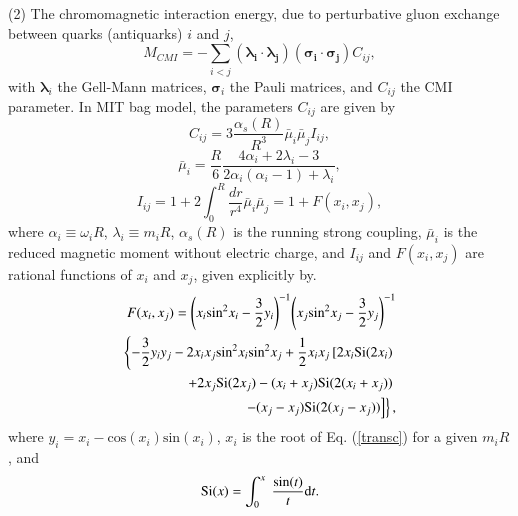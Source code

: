 \documentclass[12pt,prd,onecolumn,floatfix,nofootinbib]{revtex4}
\begin{document}
(2) The chromomagnetic interaction energy, due to perturbative gluon
exchange between quarks (antiquarks) $i$ and $j$,
\begin{equation}
M_{CMI}=-\sum_{i<j}\left( \boldsymbol{\lambda _{i}}\cdot \boldsymbol{\lambda
_{j}}\right) \left( \boldsymbol{\sigma _{i}}\cdot \boldsymbol{\sigma _{j}}%
\right) C_{ij},  \label{CMI}
\end{equation}%
with $\boldsymbol{\lambda }_{i}$ the Gell-Mann matrices, $\boldsymbol{\sigma
}_{i}$ the Pauli matrices, and $C_{ij}$ the CMI parameter. In MIT bag model,
the parameters $C_{ij}$ are given by
\begin{equation}
C_{ij}=3\frac{\alpha _{s}\left( R\right) }{R^{3}}\bar{\mu}_{i}\bar{\mu}%
_{j}I_{ij},  \label{Cij}
\end{equation}%
\begin{equation}
\bar{\mu}_{i}=\frac{R}{6}\frac{4\alpha _{i}+2\lambda _{i}-3}{2\alpha
_{i}\left( \alpha _{i}-1\right) +\lambda _{i}},  \label{muBari}
\end{equation}%
\begin{equation}
I_{ij}=1+2\int_{0}^{R}\frac{dr}{r^{4}}\bar{\mu}_{i}\bar{\mu}%
_{j}=1+F(x_{i},x_{j}),  \label{Iij}
\end{equation}%
where $\alpha _{i}\equiv \omega _{i}R$, $\lambda _{i}\equiv m_{i}R$, $\alpha
_{s}\left( R\right) $ is the running strong coupling, $\bar{\mu}_{i}$ is the
reduced magnetic moment without electric charge, and $I_{ij}$ and $%
F(x_{i},x_{j})$ are rational functions of $x_{i}$ and $x_{j}$, given
explicitly by\cite{DeGrand:1975cf}.
\begin{equation}
\begin{aligned} F(x_{i}, x_{j})={\left(x_{i} {\rm
sin}^{2}x_{i}-\frac{3}{2}y_{i}\right)}^{-1} {\left(x_{j} {\rm
sin^{2}}x_{j}-\frac{3}{2}y_{j}\right)}^{-1} \\
\left\{-\frac{3}{2}y_{i}y_{j}-2x_{i}x_{j} {\rm sin}^{2}x_{i} {\rm
sin}^{2}x_{j} +\frac{1}{2}x_{i}x_{j}\left[2x_{i} {\rm Si}(2x_{i})
\right.\right.\\ \left.\left. +2x_{j} {\rm Si}(2x_{j}) -(x_{i}+x_{j}) {\rm
Si}(2(x_{i}+x_{j})) \right.\right.\\ \left.\left. -(x_{j}-x_{j}) {\rm
Si}(2(x_{j}-x_{j})) \right] \right\}, \end{aligned}  \label{F}
\end{equation}%
where $y_{i}=x_{i}-\mathrm{cos}(x_{i})\mathrm{sin}(x_{i})$, $x_{i}$ is the 
root of Eq. (\ref{transc}) for a given $m_{i}R$, and
\begin{equation}
\mathrm{Si}(x)=\int_{0}^{x}\ \frac{{\rm sin}(t)}{t} {\rm d}t.
\end{equation}
\end{document}
